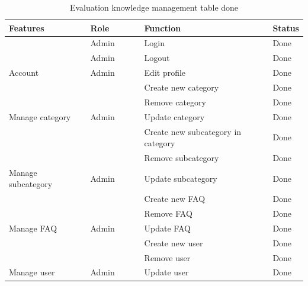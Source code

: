 \documentclass[12pt,oneside,openright,a4paper]{cpe-english-project}
\begin{document}
	\begin{table}[h]
		\caption{Evaluation knowledge management table done}
		\label{tab:Evaluation knowledge management table done}
	\begin{adjustbox}{width=\textwidth}
	\begin{tabular}{|p{0.3\linewidth}|p{0.2\linewidth}|p{0.5\linewidth}|p{0.1\linewidth}|}
	\hline
	\rowcolor[HTML]{C9DAF8} 
	Features                             & Role                    & Function                           & Status \\ \hline
										 & Admin                   & Login                              & Done   \\ \cline{2-4} 
										 & Admin                   & Logout                             & Done   \\ \cline{2-4} 
	\multirow{-3}{*}{Account}            & Admin                   & Edit profile                       & Done   \\ \hline
										 &                         & Create new category                & Done   \\ \cline{3-4} 
										 &                         & Remove category                    & Done   \\ \cline{3-4} 
	\multirow{-3}{*}{Manage category}    & \multirow{-3}{*}{Admin} & Update category                    & Done   \\ \hline
										 &                         & Create new subcategory in category & Done   \\ \cline{3-4} 
										 &                         & Remove subcategory                 & Done   \\ \cline{3-4} 
	\multirow{-3}{*}{Manage subcategory} & \multirow{-3}{*}{Admin} & Update subcategory                 & Done   \\ \hline
										 &                         & Create new FAQ                     & Done   \\ \cline{3-4} 
										 &                         & Remove FAQ                         & Done   \\ \cline{3-4} 
	\multirow{-3}{*}{Manage FAQ}         & \multirow{-3}{*}{Admin} & Update FAQ                         & Done   \\ \hline
										 &                         & Create new user                    & Done   \\ \cline{3-4} 
										 &                         & Remove user                        & Done   \\ \cline{3-4} 
	\multirow{-3}{*}{Manage   user}      & \multirow{-3}{*}{Admin} & Update user                        & Done   \\ \hline
	\end{tabular}
	\end{adjustbox}
	\end{table}
\end{document}
